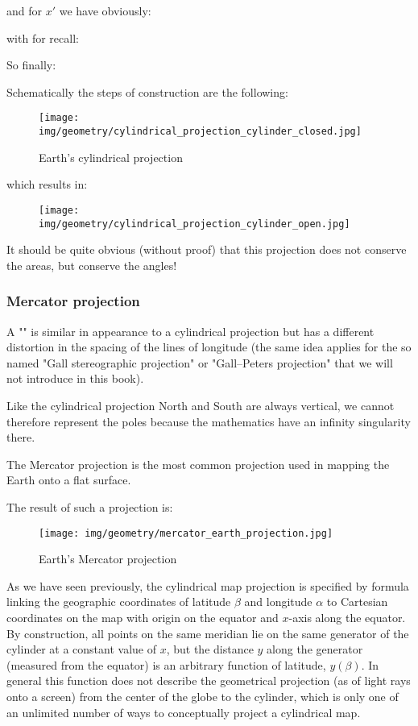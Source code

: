 	and for $x'$ we have obviously:
	
	with for recall:
	
	So finally:
	
	Schematically the steps of construction are the following:
	\begin{figure}[H]
		\centering
		\texttt{[image: img/geometry/cylindrical\_projection\_cylinder\_closed.jpg]}
		\caption{Earth's cylindrical projection}
	\end{figure}
	which results in:
	\begin{figure}[H]
		\centering
		\texttt{[image: img/geometry/cylindrical\_projection\_cylinder\_open.jpg]}
	\end{figure}
	It should be quite obvious (without proof) that this projection does not conserve the areas, but conserve the angles!
	
	\subsubsection{Mercator projection}
	A "" is similar in appearance to a cylindrical projection but has a different distortion in the spacing of the lines of longitude (the same idea applies for the so named "Gall stereographic projection" or "Gall–Peters projection" that we will not introduce in this book). 

	Like the cylindrical projection North and South are always vertical, we cannot therefore represent the poles because the mathematics have an infinity singularity there.

	The Mercator projection is the most common projection used in mapping the Earth onto a flat surface. 
	
	The result of such a projection is:
	\begin{figure}[H]
		\centering
		\texttt{[image: img/geometry/mercator\_earth\_projection.jpg]}
		\caption{Earth's Mercator projection}
	\end{figure}
	As we have seen previously, the cylindrical map projection is specified by formula linking the geographic coordinates of latitude $\beta$ and longitude $\alpha$ to Cartesian coordinates on the map with origin on the equator and $x$-axis along the equator. By construction, all points on the same meridian lie on the same generator of the cylinder at a constant value of $x$, but the distance $y$ along the generator (measured from the equator) is an arbitrary function of latitude, $y(\beta)$. In general this function does not describe the geometrical projection (as of light rays onto a screen) from the center of the globe to the cylinder, which is only one of an unlimited number of ways to conceptually project a cylindrical map.
	
